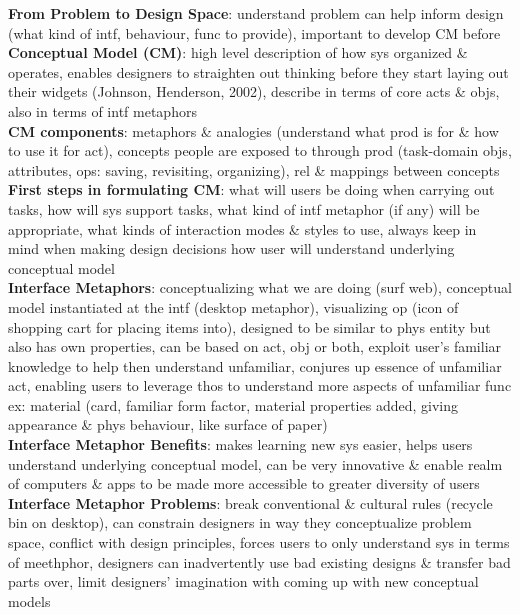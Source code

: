 \documentclass[a4paper]{article}
\begin{document}
\begin{multicols}{3}
        \textbf{From Problem to Design Space}: understand problem can help inform design (what kind of intf, behaviour, func to provide), important to develop CM before\\
        \textbf{Conceptual Model (CM)}: high level description of how sys organized \& operates, enables designers to straighten out thinking before they start laying out their widgets (Johnson, Henderson, 2002), describe in terms of core acts \& objs, also in terms of intf metaphors\\
        \textbf{CM components}: metaphors \& analogies (understand what prod is for \& how to use it for act), concepts people are exposed to through prod (task-domain objs, attributes, ops: saving, revisiting, organizing), rel \& mappings between concepts\\
        \textbf{First steps in formulating CM}: what will users be doing when carrying out tasks, how will sys support tasks, what kind of intf metaphor (if any) will be appropriate, what kinds of interaction modes \& styles to use, always keep in mind when making design decisions how user will understand underlying conceptual model\\
        \textbf{Interface Metaphors}: conceptualizing what we are doing (surf web), conceptual model instantiated at the intf (desktop metaphor), visualizing op (icon of shopping cart for placing items into), designed to be similar to phys entity but also has own properties, can be based on act, obj or both, exploit user's familiar knowledge to help then understand unfamiliar, conjures up essence of unfamiliar act, enabling users to leverage thos to understand more aspects of unfamiliar func ex: material (card, familiar form factor, material properties added, giving appearance \& phys behaviour, like surface of paper)\\
        \textbf{Interface Metaphor Benefits}: makes learning new sys easier, helps users understand underlying conceptual model, can be very innovative \& enable realm of computers \& apps to be made more accessible to greater diversity of users\\
        \textbf{Interface Metaphor Problems}: break conventional \& cultural rules (recycle bin on desktop), can constrain designers in way they conceptualize problem space, conflict with design principles, forces users to only understand sys in terms of meethphor, designers can inadvertently use bad existing designs \& transfer bad parts over, limit designers' imagination with coming up with new conceptual models\\

\end{multicols}
\end{document}
